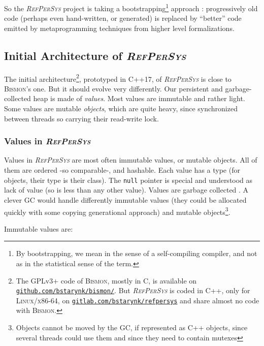 \documentclass{IEEEtran}
\newcommand{\RefPerSys}{{\textit{\textsc{RefPerSys}}}}
\begin{document}
So the {\RefPerSys} project is taking a bootstrapping\footnote{By bootstrapping,
we mean in the sense of a self-compiling compiler, and not as in the statistical
sense of the term.} approach
\cite{Pitrat:1996:FGCS, Pitrat:2009:ArtifBeings,
  hernandez-phillips:2019:debugging-bootstrap} : progressively old
code (perhaps even hand-written, or generated) is replaced by
``better'' code emitted by metaprogramming techniques from higher
level formalizations.


\subsection{Initial Architecture of \RefPerSys}
\label{subsec:initarch}

The initial architecture\footnote{The GPLv3+ code of \textsc{Bismon},
mostly in C, is available on
\href{https://github.com/bstarynk/bismon/}{\texttt{github.com/bstarynk/bismon/}}. But
     {\RefPerSys} is coded in C++, only for \textsc{Linux/x86-64}, on
     \href{https://gitlab.com/bstarynk/refpersys}{\texttt{gitlab.com/bstarynk/refpersys}}
     and share almost no code with \textsc{Bismon}.}, prototyped in
C++17, of {\RefPerSys} is close to \textsc{Bismon}'s one. But it
should evolve very differently. Our persistent and garbage-collected
\cite{jones:2016:gchandbook} heap is made of \emph{values}. Most
values are immutable and rather light. Some values are mutable
\emph{objects}, which are quite heavy, since synchronized between
threads so carrying their read-write lock.


\subsubsection{Values in  \RefPerSys}

Values in {\RefPerSys} are most often immutable values, or mutable
objects. All of them are ordered -so comparable-, and hashable. Each
value has a type (for objects, their type is their class). The
\texttt{null} pointer is special and understood as lack of value (so
is less than any other value). Values are garbage collected
\cite{jones:2017:gchandbook}. A clever GC would handle differently
immutable values (they could be allocated quickly with some copying
generational approach) and mutable objects\footnote{Objects cannot be
moved by the GC, if represented as C++ objects, since several threads
could use them and since they need to contain mutexes}.

Immutable values are:
\end{document}
